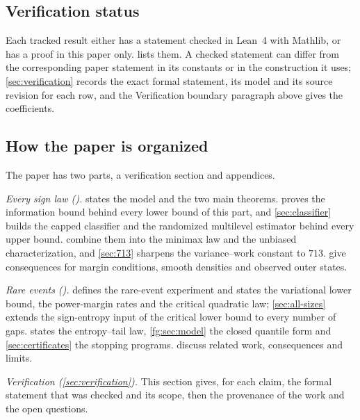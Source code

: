 \subsection{Verification status}\label{sec:status-table}
Each tracked result either has a statement checked in Lean~4 with Mathlib,
or has a proof in this paper only.  lists them. A
checked statement can differ from the corresponding paper statement in its
constants or in the construction it uses; \cref{sec:verification} records
the exact formal statement, its model and its source revision for each
row, and the Verification boundary paragraph above gives the coefficients.



\subsection{How the paper is organized}\label{sec:organization}
The paper has two parts, a verification section and appendices.

\emph{Every sign law ().}
 states the model and the two main theorems.
 proves the information bound behind every lower bound of
this part, and \cref{sec:classifier} builds the capped classifier and the
randomized multilevel estimator behind every upper bound.
 combine them into the minimax
law and the unbiased characterization, and \cref{sec:713} sharpens the
variance--work constant to $713$. 
give consequences for margin conditions, smooth densities and observed
outer states.

\emph{Rare events ().}
 defines the rare-event experiment and states the
variational lower bound, the power-margin rates and the critical quadratic
law; \cref{sec:all-sizes} extends the sign-entropy input of the critical
lower bound to every number of gaps.  states the
entropy--tail law, \cref{fg:sec:model} the closed quantile form and
\cref{sec:certificates} the stopping programs.
 discuss related work, consequences
and limits.

\emph{Verification (\cref{sec:verification}).} This section gives, for
each claim, the formal statement that was checked and its scope, then the
provenance of the work and the open questions.


